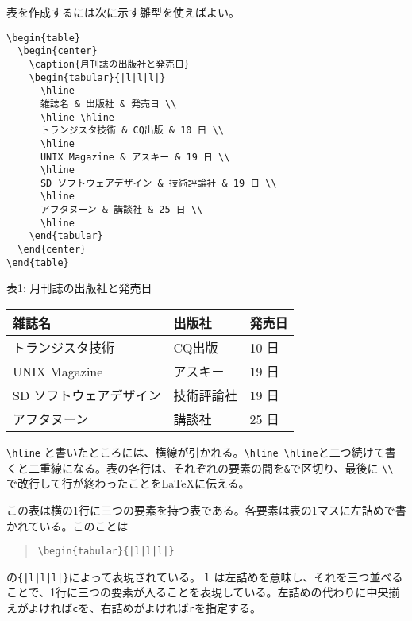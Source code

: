 表を作成するには次に示す雛型を使えばよい。
\begin{reidai}
\begin{verbatim}
\begin{table}
  \begin{center}
    \caption{月刊誌の出版社と発売日}
    \begin{tabular}{|l|l|l|}
      \hline
      雑誌名 & 出版社 & 発売日 \\
      \hline \hline
      トランジスタ技術 & CQ出版 & 10 日 \\
      \hline
      UNIX Magazine & アスキー & 19 日 \\
      \hline
      SD ソフトウェアデザイン & 技術評論社 & 19 日 \\
      \hline
      アフタヌーン & 講談社 & 25 日 \\
      \hline
    \end{tabular}
  \end{center}
\end{table}
\end{verbatim}
\end{reidai}
\vspace*{-1.5em}
\begin{kekka}
  \begin{center}
    表1: 月刊誌の出版社と発売日 \\
    \begin{tabular}{|l|l|l|}
      \hline
      雑誌名 & 出版社 & 発売日 \\
      \hline \hline
      トランジスタ技術 & CQ出版 & 10 日 \\
      \hline
      UNIX Magazine & アスキー & 19 日 \\
      \hline
      SD ソフトウェアデザイン & 技術評論社 & 19 日 \\
      \hline
      アフタヌーン & 講談社 & 25 日 \\
      \hline
    \end{tabular}
  \end{center}
\end{kekka} \noindent
\verb|\hline| と書いたところには、横線が引かれる。\verb|\hline \hline|と二つ続けて書くと二重線になる。表の各行は、それぞれの要素の間を\texttt{\&}で区切り、最後に \texttt{\textbackslash \textbackslash} で改行して行が終わったことを\LaTeX に伝える。

この表は横の1行に三つの要素を持つ表である。各要素は表の1マスに左詰めで書かれている。このことは
\begin{quotation}
  \verb-\begin{tabular}{|l|l|l|}-
\end{quotation}
の\verb-{|l|l|l|}-によって表現されている。 \texttt{l} は左詰めを意味し、それを三つ並べることで、1行に三つの要素が入ることを表現している。左詰めの代わりに中央揃えがよければ\texttt{c}を、右詰めがよければ\texttt{r}を指定する。

